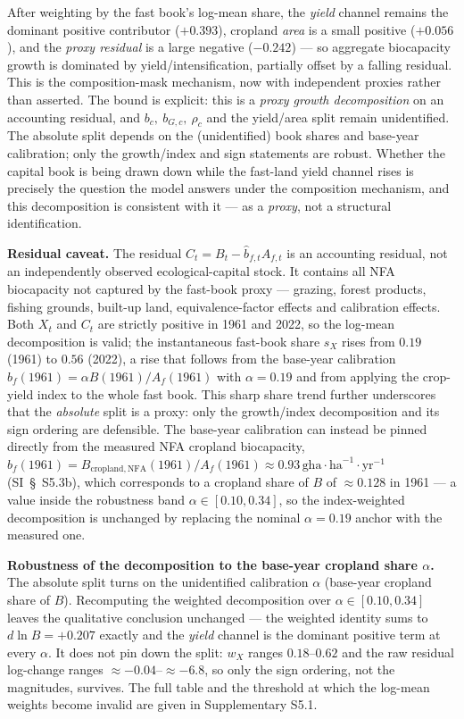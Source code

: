 \documentclass[11pt]{article}
\begin{document}
After weighting by the fast book's log-mean share, the \emph{yield} channel remains the dominant positive
contributor ($+0.393$), cropland \emph{area} is a small positive ($+0.056$), and the \emph{proxy residual} is a
large negative ($-0.242$) --- so aggregate biocapacity growth is dominated by yield/intensification, partially
offset by a falling residual. This is the composition-mask mechanism, now with independent proxies rather than
asserted. The bound is explicit: this is a \emph{proxy growth decomposition} on an accounting residual, and
$b_c,\ b_{G,c},\ \rho_c$ and the yield/area split remain unidentified. The absolute split depends on the
(unidentified) book shares and base-year calibration; only the growth/index and sign statements are robust.
Whether the capital book is being drawn down while the fast-land yield channel rises is precisely the question
the model answers under the composition mechanism, and this decomposition is consistent with it --- as a \emph{proxy}, not a structural identification.

\textbf{Residual caveat.} The residual $C_t=B_t-\hat b_{f,t}A_{f,t}$ is an accounting residual, not an
independently observed ecological-capital stock. It contains all NFA biocapacity not captured by the fast-book
proxy --- grazing, forest products, fishing grounds, built-up land, equivalence-factor effects and calibration
effects. Both $X_t$ and $C_t$ are strictly positive in 1961 and 2022, so the log-mean decomposition is valid; the
instantaneous fast-book share $s_X$ rises from $0.19$ (1961) to $0.56$ (2022), a rise that follows from the
base-year calibration $b_f(1961)=\alpha B(1961)/A_f(1961)$ with $\alpha=0.19$ and from applying the crop-yield
index to the whole fast book. This sharp share trend further underscores that the \emph{absolute} split is a
proxy: only the growth/index decomposition and its sign ordering are defensible. The base-year calibration can
instead be pinned directly from the measured NFA cropland biocapacity,
$b_f(1961)=B_{\mathrm{cropland,NFA}}(1961)/A_f(1961)\approx0.93\,\text{gha}\cdot\text{ha}^{-1}\cdot\text{yr}^{-1}$
(SI~\S\ S5.3b), which corresponds to a cropland share of $B$ of $\approx0.128$ in 1961 --- a value inside the
robustness band $\alpha\in[0.10,0.34]$, so the index-weighted decomposition is unchanged by replacing the
nominal $\alpha=0.19$ anchor with the measured one.

\medskip
\noindent\textbf{Robustness of the decomposition to the base-year cropland share $\alpha$.} The absolute split turns on
the unidentified calibration $\alpha$ (base-year cropland share of $B$). Recomputing the weighted decomposition
over $\alpha\in[0.10,0.34]$ leaves the qualitative conclusion unchanged --- the weighted identity sums to
$d\ln B=+0.207$ exactly and the \emph{yield} channel is the dominant positive term at every $\alpha$. It does
not pin down the split: $w_X$ ranges $0.18$--$0.62$ and the raw residual log-change ranges $\approx-0.04$--$\approx-6.8$,
so only the sign ordering, not the magnitudes, survives. The full table and the threshold at which the
log-mean weights become invalid are given in Supplementary S5.1.
\end{document}

